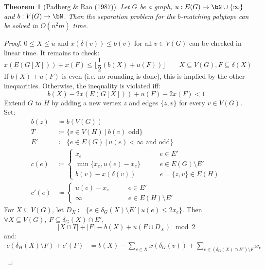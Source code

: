 \documentclass[11pt, a4paper]{article}
\newcommand{\floor}[1]{\lfloor #1 \rfloor}
\newcommand{\abs}[1]{\left\lvert#1\right\rvert}
\newcommand{\set}[1]{\{#1\}}
\newtheorem{theorem}{Theorem}[section]
\theoremstyle{remark}
\theoremstyle{definition}
\begin{document}
\begin{theorem}[Padberg \& Rao (1987)]\label{thm:padberg-rao}
	Let $G$ be a graph, $u: E(G)\to\bN\cup\set{\infty}$ and
	$b: V(G)\to\bN$. Then the separation problem for the $b$-matching
	polytope can be solved in $O(n^2m)$ time.
\end{theorem}
\begin{proof}
	$0\leq X\leq u$ and $x(\delta(v))\leq b(v)$ for all $v\in V(G)$ can be
	checked in linear time. It remains to check:
	\[x(E(G[X]))+x(F)\leq \floor{\frac{1}{2}\left(b(X)+u(F)\right)}
		\qquad X\subseteq V(G),F\subseteq \delta(X)\]
	If $b(X)+u(F)$ is even (i.e. no rounding is done), this is implied by
	the other inequarities. Otherwise, the inequality is violated iff:
	\[b(X)-2x(E(G[X]))+u(F)-2x(F)<1\]
	Extend $G$ to $H$ by adding a new vertex $z$ and edges $\set{z,v}$
	for every $v\in V(G)$. Set:
	\begin{align*}
		b(z)  & \coloneqq b(V(G))                                                                       \\
		T     & \coloneqq\set{v\in V(H) \ |\ b(v)\text{ odd}}                                           \\
		E'    & \coloneqq \set{e\in E(G)\ |\ u(e)<\infty\text{ and odd}}                                \\
		c(e)  & \coloneqq\begin{cases}
			                 x_e \qquad                    & e\in E'               \\
			                 \min\set{x_e,u(e)-x_e} \qquad & e\in E(G)\setminus E' \\
			                 b(v) - x(\delta(v)) \qquad    & e=\set{z,v}\in E(H)
		                 \end{cases} \\
		c'(e) & \coloneqq \begin{cases}
			                  u(e) - x_e \qquad & e\in E'               \\
			                  \infty \qquad     & e\in E(H)\setminus E'
		                  \end{cases}
	\end{align*}
	For $X\subseteq V(G)$, let $D_X\coloneqq \set{e\in \delta_G(X)\setminus E'
			\ |\ u(e)\leq 2x_e}$. Then $\forall X\subseteq V(G),\ F\subseteq \delta_G(X)
		\cap E'$,
	\[\abs{X\cap T}+\abs{F}\equiv b(X)+u(F\cup D_X) \mod 2\]
	and:
	\begin{align*}
		c(\delta_H(X)\setminus F)+c'(F) & =b(X)-\sum_{v\in X}x(\delta_G(v))+\sum_{e\in(\delta_G(X)\cap E')\setminus F}x_e    \\

\end{align*}
\end{proof}
\end{document}
